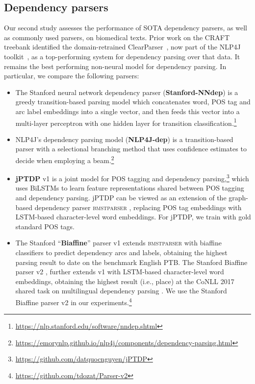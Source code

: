 \documentclass[twocolumn,hyperref]{bmcart}\pdfoutput=1
\begin{document}
\subsection*{Dependency parsers}

Our second study assesses the performance of SOTA dependency parsers, as well as commonly used parsers, on biomedical texts. 
Prior work on the CRAFT treebank identified the domain-retrained ClearParser~\cite{choi2009k}, now part of the NLP4J toolkit~\cite{choi-tetreault-stent:2015:ACL-IJCNLP}, as a top-performing system for dependency parsing over that data. It remains the best performing non-neural model for dependency parsing.
 In particular, we compare the following  parsers:

\begin{itemize} 

\item  The Stanford neural network dependency parser  \cite{D14-1082}  (\textbf{Stanford-NNdep}) is a greedy  transition-based  parsing model   which concatenates word, POS tag and arc label embeddings into a single vector, and then feeds this vector into 
a multi-layer perceptron with one hidden layer for transition classification.\footnote{{\url{https://nlp.stanford.edu/software/nndep.shtml}}}

\item {NLP4J}'s dependency parsing model  \cite{choi-mccallum:2013:ACL2013} (\textbf{NLP4J-dep})    is  a transition-based parser with a selectional branching method  that uses confidence estimates to decide when employing a beam.\footnote{{\url{https://emorynlp.github.io/nlp4j/components/dependency-parsing.html}} }  


\item \textbf{jPTDP} v1   \cite{nguyen-dras-johnson-2017} is a  joint model for POS tagging and dependency parsing,\footnote{{\url{https://github.com/datquocnguyen/jPTDP}}} which uses BiLSTMs to learn feature representations shared between POS tagging and dependency parsing. jPTDP can be viewed as an extension of the  graph-based dependency parser \textsc{bmstparser} \cite{TACL885}, replacing POS tag embeddings with LSTM-based character-level word embeddings. For jPTDP, we train with gold standard POS tags.
 
\item The  Stanford ``\textbf{Biaffine}'' parser v1  \cite{DozatM16} extends \textsc{bmstparser} with biaffine classifiers to predict dependency arcs and labels, obtaining the highest parsing result to date on the benchmark English PTB.  
The Stanford Biaffine  parser v2 \cite{dozat-qi-manning:2017:K17-3}, further extends  v1 with  LSTM-based character-level word embeddings, obtaining the highest result (i.e.,  place) at the CoNLL 2017 shared task on multilingual dependency parsing \cite{zeman-EtAl:2017:K17-3}.   We use  the Stanford Biaffine  parser v2 in our experiments.\footnote{{\url{https://github.com/tdozat/Parser-v2}}}
 
\end{itemize}
\end{document}
